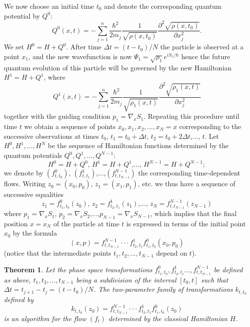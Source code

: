 \documentclass[12pt]{article}%
\newtheorem{theorem}{Theorem}
\begin{document}
We now choose an initial time $t_{0}$ and denote the corresponding quantum
potential by $Q^{0}$:%
\begin{equation}
Q^{0}(x,t)=-\sum_{j=1}^{n}\frac{\hbar^{2}}{2m_{j}}\frac{1}{\sqrt{\rho
(x,t_{0})}}\frac{\partial^{2}\sqrt{\rho(x,t_{0})}}{\partial x_{j}^{2}}.
\label{qpsi0}%
\end{equation}
We set $H^{0}=H+Q^{0}$. After time $\Delta t=(t-t_{0})/N$ the particle is
observed at a point $x_{1}$, and the new wavefunction is now $\Psi_{1}%
=\sqrt{\rho_{1}}e^{iS_{1}/\hbar}$ hence the future quantum evolution of this
particle will be governed by the new Hamiltonian $H^{1}=H+Q^{1}$, where%
\begin{equation}
Q^{1}(x,t)=-\sum_{j=1}^{n}\frac{\hbar^{2}}{2m_{j}}\frac{1}{\sqrt{\rho
_{1}(x,t)}}\frac{\partial^{2}\sqrt{\rho_{1}(x,t)}}{\partial x_{j}^{2}}%
\end{equation}
together with the guiding condition $p_{1}=\nabla_{x}S_{1}$. Repeating this
procedure until time $t$ we obtain a sequence of points $x_{0},x_{1}%
,x_{2},...,x_{N}=x$ corresponding to the successive observations at times
$t_{0}$, $t_{1}=t_{0}+\Delta t$, $t_{2}=t_{0}+2\Delta t$,..., $t$. Let
$H^{0},H^{1},...,H^{N}$ be the sequence of Hamiltonian functions determined by
the quantum potentials $Q^{0},Q^{1},...,Q^{N-1}$:%
\[
H^{0}=H+Q^{0}\text{, }H^{1}=H+Q^{1}\text{,...,\ }H^{N-1}=H+Q^{N-1};
\]
we denote by $(f_{t,t_{0}}^{0})$, $(f_{t,t_{1}}^{1})$,...,$(f_{t,t_{N-1}%
}^{N-1})$ the corresponding time-dependent flows. Writing $z_{0}=(x_{0}%
,p_{0})$, $z_{1}=(x_{1},p_{1})$, etc. we thus have a sequence of successive
equalities%
\[
z_{1}=f_{t_{1},t_{0}}^{0}(z_{0})\text{, }z_{2}=f_{t_{2},t_{1}}^{1}%
(z_{1})\text{,..., }z_{N}=f_{t,t_{N-1}}^{N-1}(z_{N-1})
\]
where $p_{1}=\nabla_{x}S_{1}$, $p_{2}=\nabla_{x}S_{2}$,...,$p_{N-1}=\nabla
_{x}S_{N-1}$, which implies that the final position $x=x_{N}$ of the particle
at time $t$ is expressed in terms of the initial point $x_{0}$ by the formula%
\[
(x,p)=f_{t,t_{N-1}}^{N-1}\cdot\cdot\cdot f_{t_{2},t_{1}}^{1}f_{t_{1},t_{0}%
}^{0}(x_{0},p_{0})
\]
(notice that the intermediate points $t_{1},t_{2},...,t_{N-1}$ depend on $t$).

\begin{theorem}
\label{Thm5}Let the phase space transformations $f_{t_{1},t_{0}}^{0}%
,f_{t_{2},t_{1}}^{1}...,f_{t,t_{N-1}}^{N-1}$ be defined as above, $t_{1}%
,t_{2},...,t_{N-1}$ being a subdivision of the interval $[t_{0},t]$ such that
$\Delta t=t_{j+1}-t_{j}=(t-t_{0})/N$. The two-parameter family of
transformations $k_{t,t_{0}}$ defined by
\[
k_{t,t_{0}}(z_{0})=f_{t,t_{N-1}}^{N-1}\cdot\cdot\cdot f_{t_{2},t_{1}}%
^{1}f_{t_{1},t_{0}}^{0}(z_{0})
\]
is an algorithm for the flow $(f_{t})$ determined by the classical Hamiltonian
$H$.
\end{theorem}
\end{document}
